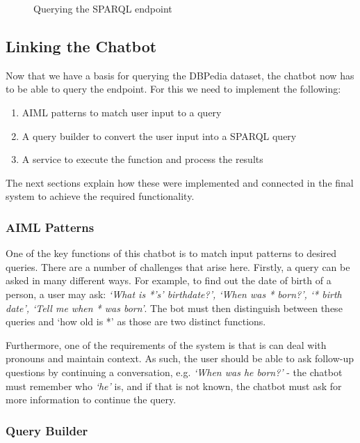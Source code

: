 \begin{figure}[h]
	\centering
	\qquad
	\caption{Querying the SPARQL endpoint}
	\label{fig:querysparql}
\end{figure}

\subsection{Linking the Chatbot}
Now that we have a basis for querying the DBPedia dataset, the chatbot now has to be able to query the endpoint. For this we need to implement the following:
\begin{enumerate}
	\item AIML patterns to match user input to a query
	\item A query builder to convert the user input into a SPARQL query
	\item A service to execute the function and process the results
\end{enumerate}
The next sections explain how these were implemented and connected in the final system to achieve the required functionality.

\subsubsection{AIML Patterns}
One of the key functions of this chatbot is to match input patterns to desired queries. There are a number of challenges that arise here. Firstly, a query can be asked in many different ways. For example, to find out the date of birth of a person, a user may ask: {\it`What is *'s' birthdate?', `When was * born?', `* birth date', `Tell me when * was born'}. The bot must then distinguish between these queries and `how old is *' as those are two distinct functions.

Furthermore, one of the requirements of the system is that is can deal with pronouns and maintain context. As such, the user should be able to ask follow-up questions by continuing a conversation, e.g. {\it `When was he born?'} - the chatbot must remember who {\it `he'} is, and if that is not known, the chatbot must ask for more information to continue the query.

\subsubsection{Query Builder}


